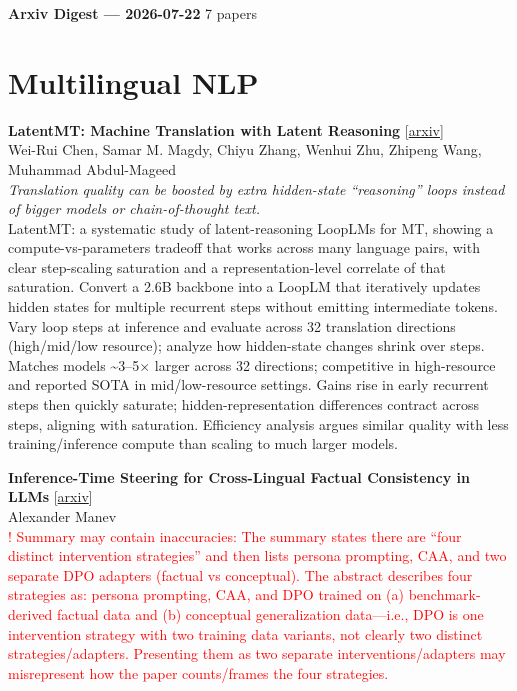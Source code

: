 \documentclass[12pt,letterpaper]{article}
\begin{document}
{\footnotesize\textbf{Arxiv Digest --- 2026-07-22} \hfill 7 papers}

\smallskip

\section*{Multilingual NLP}

{\small\textbf{LatentMT: Machine Translation with Latent Reasoning}} {\scriptsize[\href{https://arxiv.org/abs/2607.18618}{arxiv}]}\\
{\scriptsize Wei-Rui Chen, Samar M. Magdy, Chiyu Zhang, Wenhui Zhu, Zhipeng Wang, Muhammad Abdul-Mageed}\\

{\small\textit{Translation quality can be boosted by extra hidden-state ``reasoning'' loops instead of bigger models or chain-of-thought text.}}\\[1pt]
{\footnotesize LatentMT: a systematic study of latent-reasoning LoopLMs for MT, showing a compute-vs-parameters tradeoff that works across many language pairs, with clear step-scaling saturation and a representation-level correlate of that saturation. Convert a 2.6B backbone into a LoopLM that iteratively updates hidden states for multiple recurrent steps without emitting intermediate tokens. Vary loop steps at inference and evaluate across 32 translation directions (high/mid/low resource); analyze how hidden-state changes shrink over steps. Matches models \textasciitilde{}3--5× larger across 32 directions; competitive in high-resource and reported SOTA in mid/low-resource settings. Gains rise in early recurrent steps then quickly saturate; hidden-representation differences contract across steps, aligning with saturation. Efficiency analysis argues similar quality with less training/inference compute than scaling to much larger models.}

\medskip

{\small\textbf{Inference-Time Steering for Cross-Lingual Factual Consistency in LLMs}} {\scriptsize[\href{https://arxiv.org/abs/2607.19243}{arxiv}]}\\
{\scriptsize Alexander Manev}\\

{\scriptsize\textcolor{red}{! Summary may contain inaccuracies: The summary states there are ``four distinct intervention strategies'' and then lists persona prompting, CAA, and two separate DPO adapters (factual vs conceptual). The abstract describes four strategies as: persona prompting, CAA, and DPO trained on (a) benchmark-derived factual data and (b) conceptual generalization data---i.e., DPO is one intervention strategy with two training data variants, not clearly two distinct strategies/adapters. Presenting them as two separate interventions/adapters may misrepresent how the paper counts/frames the four strategies.}}\\[1pt]
\end{document}
